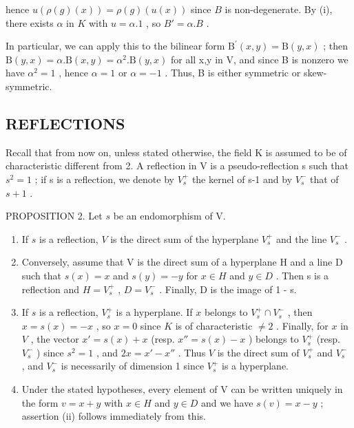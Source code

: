 hence \(u(\rho(g)(x)) = \rho(g)(u(x))\) since \(B\) is non-degenerate. By (i), there exists \(\alpha\) in \(K\) with \(u = \alpha.1\) , so \(B' = \alpha.B\) .

In particular, we can apply this to the bilinear form \(\mathrm{B}^{\prime}(x,y)=\mathrm{B}(y,x)\) ; then \(\mathrm{B}(y,x)=\alpha.\mathrm{B}(x,y)=\alpha^{2}.\mathrm{B}(y,x)\) for all x,y in V, and since B is nonzero we have \(\alpha^{2}=1\) , hence \(\alpha=1\) or \(\alpha=-1\) . Thus, B is either symmetric or skew-symmetric.

\subsection{REFLECTIONS}

Recall that from now on, unless stated otherwise, the field K is assumed to be of characteristic different from 2. A reflection in V is a pseudo-reflection s such that \(s^{2}=1\) ; if s is a reflection, we denote by \(V_{s}^{+}\) the kernel of s-1 and by \(V_{s}^{-}\) that of \(s+1\) .

PROPOSITION 2. Let \(s\) be an endomorphism of V.

\begin{enumerate}
\def\labelenumi{(\roman{enumi})}
\item
  If \(s\) is a reflection, \(V\) is the direct sum of the hyperplane \(V_s^+\) and the line \(V_s^-\) .
\item
  Conversely, assume that V is the direct sum of a hyperplane H and a line D such that \(s(x) = x\) and \(s(y) = -y\) for \(x \in H\) and \(y \in D\) . Then s is a reflection and \(H = V_{s}^{+}\) , \(D = V_{s}^{-}\) . Finally, D is the image of 1 - s.
\item
  If \(s\) is a reflection, \(V_{s}^{+}\) is a hyperplane. If \(x\) belongs to \(V_{s}^{+} \cap V_{s}^{-}\) , then \(x = s(x) = -x\) , so \(x = 0\) since \(K\) is of characteristic \(\neq 2\) . Finally, for \(x\) in \(V\) , the vector \(x' = s(x) + x\) (resp. \(x'' = s(x) - x\) ) belongs to \(V_{s}^{+}\) (resp. \(V_{s}^{-}\) ) since \(s^2 = 1\) , and \(2x = x' - x''\) . Thus \(V\) is the direct sum of \(V_{s}^{+}\) and \(V_{s}^{-}\) , and \(V_{s}^{-}\) is necessarily of dimension 1 since \(V_{s}^{+}\) is a hyperplane.
\item
  Under the stated hypotheses, every element of V can be written uniquely in the form \(v = x + y\) with \(x \in H\) and \(y \in D\) and we have \(s(v) = x - y\) ; assertion (ii) follows immediately from this.
\end{enumerate}

